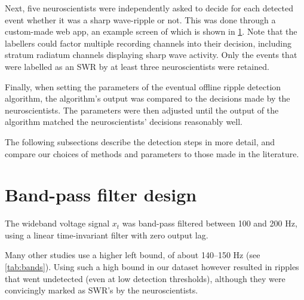 Next, five neuroscientists were independently asked to decide for each detected event whether it was a sharp wave-ripple or not. This was done through a custom-made web app, an example screen of which is shown in \cref{fig:labelface-UI}. Note that the labellers could factor multiple recording channels into their decision, including stratum radiatum channels displaying sharp wave activity. Only the events that were labelled as an SWR by at least three neuroscientists were retained.

Finally, when setting the parameters of the eventual offline ripple detection algorithm, the algorithm's output was compared to the decisions made by the neuroscientists. The parameters were then adjusted until the output of the algorithm matched the neuroscientists' decisions reasonably well.

The following subsections describe the detection steps in more detail, and compare our choices of methods and parameters to those made in the literature.

\begin{figure}
\label{fig:labelface-UI}
\end{figure}


\section{Band-pass filter design}

The wideband voltage signal $x_t$ was band-pass filtered between 100 and 200 Hz, using a linear time-invariant filter with zero output lag.

Many other studies use a higher left bound, of about 140--150 Hz (see \cref{tab:bands}). Using such a high bound in our dataset however resulted in ripples that went undetected (even at low detection thresholds), although they were convicingly marked as SWR's by the neuroscientists.

